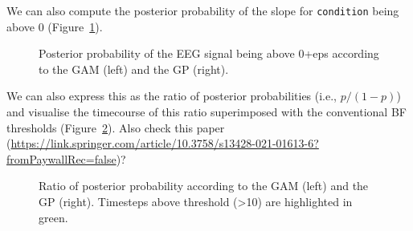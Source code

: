 \documentclass[
  doc,
  floatsintext,
  longtable,
  a4paper,
  nolmodern,
  notxfonts,
  notimes,
  colorlinks=true,linkcolor=blue,citecolor=blue,urlcolor=blue]{apa7}
\begin{document}
We can also compute the posterior probability of the slope for
\texttt{condition} being above 0 (Figure~\ref{fig-post-prob-test}).

\begin{figure}[!htb]

\caption{\label{fig-post-prob-test}Posterior probability of the EEG
signal being above 0+eps according to the GAM (left) and the GP
(right).}


\end{figure}%

We can also express this as the ratio of posterior probabilities (i.e.,
\(p/(1-p)\)) and visualise the timecourse of this ratio superimposed
with the conventional BF thresholds (Figure~\ref{fig-post-prob-ratio}).
Also check this paper
(\url{https://link.springer.com/article/10.3758/s13428-021-01613-6?fromPaywallRec=false})?

\begin{figure}[!htb]

\caption{\label{fig-post-prob-ratio}Ratio of posterior probability
according to the GAM (left) and the GP (right). Timesteps above
threshold (\textgreater10) are highlighted in green.}


\end{figure}%
\end{document}
